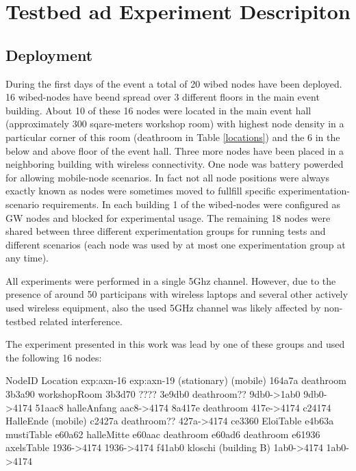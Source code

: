 \documentclass[a4paper,12pt,twoside]{article}
\begin{document}
\section{Testbed ad Experiment Descripiton}

\subsection{Deployment}

During the first days of the event a total of 20 wibed nodes have been
deployed. 16 wibed-nodes have beend spread over 3 different floors in
the main event building. About 10 of these 16 nodes were located in
the main event hall (approximately 300 sqare-meters workshop room)
with highest node density in a particular corner of this room
(deathroom in Table \ref{locations}) and the 6 in the below and above floor of the event
hall. Three more nodes have been placed in a neighboring building with
wireless connectivity.  One node was battery powerded for allowing
mobile-node scenarios.  In fact not all node positions were always
exactly known as nodes were sometimes moved to fullfill specific
experimentation-scenario requirements.  In each building 1 of the
wibed-nodes were configured as GW nodes and blocked for experimental
usage. The remaining 18 nodes were shared between three different
experimentation groups for running tests and different scenarios (each
node was used by at most one experimentation group at any time).

All experiments were performed in a single 5Ghz channel. However, due
to the presence of around 50 participans with wireless laptops and
several other actively used wireless equipment, also the used 5GHz
channel was likely affected by non-testbed related interference.

The experiment presented in this work was lead by one of these groups
and used the following 16 nodes:

\begin{rawtext}[caption={Node locations and experiment usage}, label=locations]
NodeID  Location               exp:axn-16   exp:axn-19
                               (stationary) (mobile)
164a7a  deathroom
3b3a90  workshopRoom
3b3d70  ????
3e9db0  deathroom??            9db0->1ab0  9db0->4174
51aac8  halleAnfang                        aac8->4174
8a417e  deathroom              417e->4174   
c24174  HalleEnde (mobile)                  
c2427a  deathroom??                        427a->4174
ce3360  EloiTable
e4b63a  mustiTable
e60a62  halleMitte
e60aac  deathroom
e60ad6  deathroom
e61936  axelsTable             1936->4174  1936->4174
f41ab0  kloschi (building B)   1ab0->4174  1ab0->4174
\end{rawtext}
\end{document}
